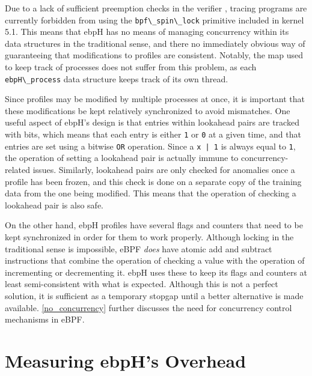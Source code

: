 \documentclass[
  12pt]{findlay}
\newcommand{\passthrough}[1]{#1}
\begin{document}
\label{impl_no_conc}

Due to a lack of sufficient preemption checks in the verifier
\autocite{verifier_git,bpf_h_git}, tracing programs are currently
forbidden from using the \passthrough{\lstinline!bpf\_spin\_lock!}
primitive included in kernel 5.1. This means that ebpH has no means of
managing concurrency within its data structures in the traditional
sense, and there no immediately obvious way of guaranteeing that
modifications to profiles are consistent. Notably, the map used to keep
track of processes does not suffer from this problem, as each
\passthrough{\lstinline!ebpH\_process!} data structure keeps track of
its own thread.

Since profiles may be modified by multiple processes at once, it is
important that these modifications be kept relatively synchronized to
avoid mismatches. One useful aspect of ebpH's design is that entries
within lookahead pairs are tracked with bits, which means that each
entry is either \passthrough{\lstinline!1!} or
\passthrough{\lstinline!0!} at a given time, and that entries are set
using a bitwise \passthrough{\lstinline!OR!} operation. Since a
\passthrough{\lstinline!x | 1!} is always equal to
\passthrough{\lstinline!1!}, the operation of setting a lookahead pair
is actually immune to concurrency-related issues. Similarly, lookahead
pairs are only checked for anomalies once a profile has been frozen, and
this check is done on a separate copy of the training data from the one
being modified. This means that the operation of checking a lookahead
pair is also safe.

On the other hand, ebpH profiles have several flags and counters that
need to be kept synchronized in order for them to work properly.
Although locking in the traditional sense is impossible, eBPF
\emph{does} have atomic add and subtract instructions
\autocite{bpf_h_git} that combine the operation of checking a value with
the operation of incrementing or decrementing it. ebpH uses these to
keep its flags and counters at least semi-consistent with what is
expected. Although this is not a perfect solution, it is sufficient as a
temporary stopgap until a better alternative is made available.
\autoref{no_concurrency} further discusses the need for concurrency
control mechanisms in eBPF.

\hypertarget{measuring-ebphs-overhead}{%
\section{Measuring ebpH's Overhead}\label{measuring-ebphs-overhead}}
\end{document}
